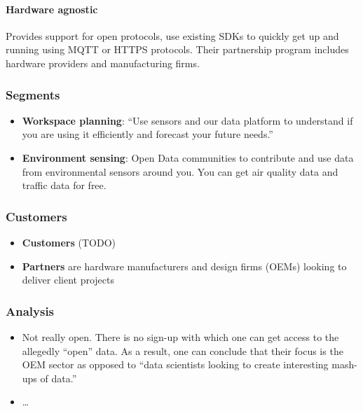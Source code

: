 \paragraph{Hardware agnostic}\label{hardware-agnostic}

Provides support for open protocols, use existing SDKs to quickly get up
and running using MQTT or HTTPS protocols. Their partnership program
includes hardware providers and manufacturing firms.

\subsubsection{Segments}\label{segments}

\begin{itemize}
\tightlist
\item
  \textbf{Workspace planning}: ``Use sensors and our data platform to
  understand if you are using it efficiently and forecast your future
  needs.''
\item
  \textbf{Environment sensing}: Open Data communities to contribute and
  use data from environmental sensors around you. You can get air
  quality data and traffic data for free.
\end{itemize}

\subsubsection{Customers}\label{customers}

\begin{itemize}
\tightlist
\item
  \textbf{Customers} (TODO)
\item
  \textbf{Partners} are hardware manufacturers and design firms (OEMs)
  looking to deliver client projects
\end{itemize}

\subsubsection{Analysis}\label{analysis}

\begin{itemize}
\tightlist
\item
  Not really open. There is no sign-up with which one can get access to
  the allegedly ``open'' data. As a result, one can conclude that their
  focus is the OEM sector as opposed to ``data scientists looking to
  create interesting mash-ups of data.''
\item
  \ldots{}
\end{itemize}

